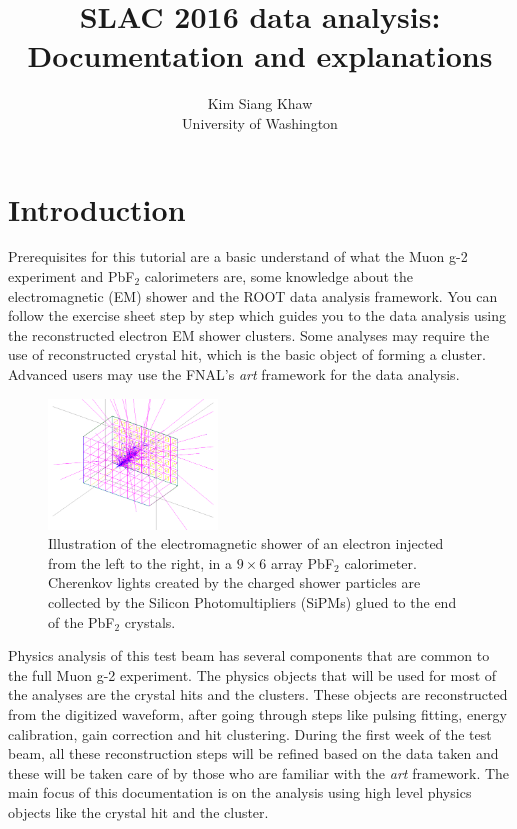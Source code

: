 \documentclass[12pt,letterpaper]{article}
\author{Kim Siang Khaw \\
University of Washington}
\title{\textbf{SLAC 2016 data analysis: Documentation and explanations}}
\begin{document}
\maketitle

\section{Introduction}
Prerequisites for this tutorial are a basic understand of what the Muon g-2 experiment and PbF$_2$ calorimeters are, some knowledge about the electromagnetic (EM) shower
and the ROOT data analysis framework. You can follow the exercise sheet step by step which guides you to the data analysis using the reconstructed electron EM shower clusters.
Some analyses may require the use of reconstructed crystal hit, which is the basic object of forming a cluster. Advanced users may use the FNAL's \textit{art} framework for the data analysis.
%
\begin{figure}[htbp]
\centering
\includegraphics[trim=3cm 1cm 3cm 0cm, width=0.4\textwidth]{pics/EMShower}
\caption{Illustration of the electromagnetic shower of an electron injected from the left to the right, in a $9\times6$ array PbF$_2$ calorimeter. Cherenkov lights created by the charged shower particles are collected by the Silicon Photomultipliers (SiPMs) glued to the end of the PbF$_2$ crystals.}
\end{figure}

Physics analysis of this test beam has several components that are common to the full Muon g-2 experiment. The physics objects that will be used for most of the analyses are the crystal hits and the clusters.
These objects are reconstructed from the digitized waveform, after going through steps like pulsing fitting, energy calibration, gain correction and hit clustering. During the first week of the test beam, all these reconstruction steps
will be refined based on the data taken and these will be taken care of by those who are familiar with the \textit{art} framework. The main focus of this documentation is on the analysis using high level physics objects like the crystal hit and the cluster.
\end{document}
